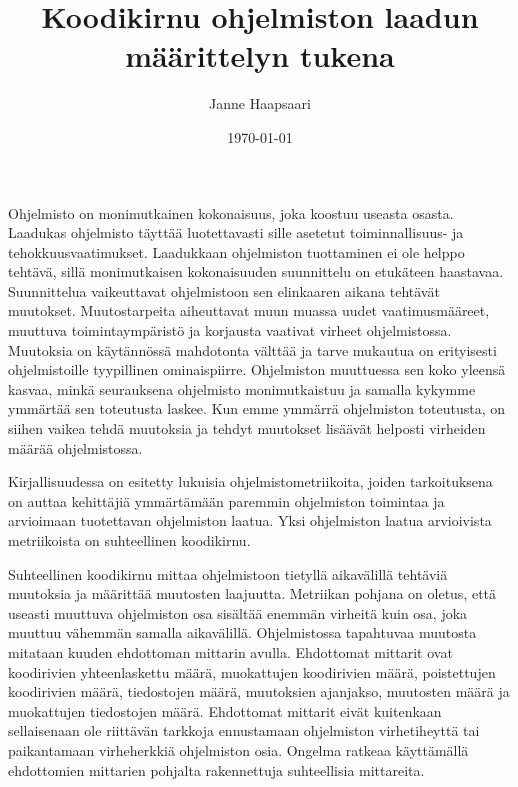 \documentclass[a4paper]{article}
\title{Koodikirnu ohjelmiston laadun määrittelyn tukena}
\author{Janne Haapsaari}
\date{\today}
\begin{document}
\maketitle

Ohjelmisto on monimutkainen kokonaisuus, joka koostuu useasta osasta. Laadukas ohjelmisto täyttää luotettavasti sille asetetut toiminnallisuus- ja tehokkuusvaatimukset. Laadukkaan ohjelmiston tuottaminen ei ole helppo tehtävä, sillä monimutkaisen kokonaisuuden suunnittelu on etukäteen haastavaa. Suunnittelua vaikeuttavat ohjelmistoon sen elinkaaren aikana tehtävät muutokset. Muutostarpeita aiheuttavat muun muassa uudet vaatimusmääreet, muuttuva toimintaympäristö ja korjausta vaativat virheet ohjelmistossa. Muutoksia on käytännössä mahdotonta välttää ja tarve mukautua on erityisesti ohjelmistoille tyypillinen ominaispiirre. Ohjelmiston muuttuessa sen koko yleensä kasvaa, minkä seurauksena ohjelmisto monimutkaistuu ja samalla kykymme ymmärtää sen toteutusta laskee. Kun emme ymmärrä ohjelmiston toteutusta, on siihen vaikea tehdä muutoksia ja tehdyt muutokset lisäävät helposti virheiden määrää ohjelmistossa.

Kirjallisuudessa on esitetty lukuisia ohjelmistometriikoita, joiden tarkoituksena on auttaa kehittäjiä ymmärtämään paremmin ohjelmiston toimintaa ja arvioimaan tuotettavan ohjelmiston laatua. Yksi ohjelmiston laatua arvioivista metriikoista on suhteellinen koodikirnu.

Suhteellinen koodikirnu mittaa ohjelmistoon tietyllä aikavälillä tehtäviä muutoksia ja määrittää muutosten laajuutta. Metriikan pohjana on oletus, että useasti muuttuva ohjelmiston osa sisältää enemmän virheitä kuin osa, joka muuttuu vähemmän samalla aikavälillä. Ohjelmistossa tapahtuvaa muutosta mitataan kuuden ehdottoman mittarin avulla. Ehdottomat mittarit ovat koodirivien yhteenlaskettu määrä, muokattujen koodirivien määrä, poistettujen koodirivien määrä, tiedostojen määrä, muutoksien ajanjakso, muutosten määrä ja muokattujen tiedostojen määrä. Ehdottomat mittarit eivät kuitenkaan sellaisenaan ole riittävän tarkkoja ennustamaan ohjelmiston virhetiheyttä tai paikantamaan virheherkkiä ohjelmiston osia. Ongelma ratkeaa käyttämällä ehdottomien mittarien pohjalta rakennettuja suhteellisia mittareita.
\end{document}
